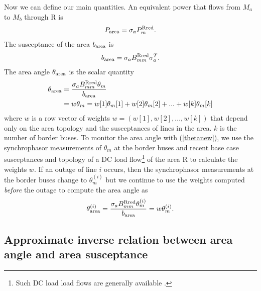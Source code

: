 \documentclass[conference]{IEEEtran}
\begin{document}
Now we can define our main quantities. An equivalent power \cite{DobsonvoltPS12} that flows 
from $M_a$ to $M_b$ through R is
\begin{align}
P_{\rm area}=\sigma_a  P_m^ {\rm Rred}.
\label{parea}
\end{align}
The susceptance of the area $b_{\rm area}$ is
\begin{align}
b_{\rm area}=\sigma_a  B_{mm}^ {\rm Rred} \sigma_a ^T.
\label{bab}
\end{align}
The area angle $\theta_{\rm area}$ is the scalar quantity
\begin{align}
\theta_{\rm area}&=\frac{\sigma_a  B_{mm}^ {\rm Rred} \theta_m}{b_{\rm area}}\notag\\
&=w  \theta_m
=w[1]  \theta_{m}[1]+w[2]  \theta_{m}[2]+...+w[k]  \theta_{m}[k]
\label{thetanew}
\end{align}
where $w$ is a row vector of weights $w=(w[1],w[2],...,w[k])$ that depend only on the 
area topology and the susceptances of lines in the area. $k$ is the number of border buses.
To monitor the area angle  with (\ref{thetanew}), we use the synchrophasor measurements of $\theta_m$ at the 
border buses and recent base case susceptances and topology of a DC load flow\footnote{Such DC load load flows are generally available \cite{TatePS08}.
}  of the area R to calculate the weights $w$.
If an outage of line $i$ occurs, then the synchrophasor measurements at the border buses change to $\theta_m^{(i)}$ but we 
continue to use the weights computed {\sl before} the outage to compute the area angle as
\begin{align}
\theta_{\rm area}^{(i)}=\frac{\sigma_a B_{mm}^ {\rm Rred} \theta_m^{(i)}}{b_{\rm area}}=w\theta_m^{(i)}.
\label{pmuareaanglei}
\end{align}

\subsection{Approximate inverse relation between area angle and area susceptance}
\end{document}
